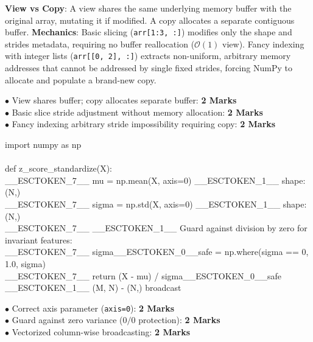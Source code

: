 \begin{solutionbox}
\textbf{View vs Copy}: A view shares the same underlying memory buffer with the original array, mutating it if modified. A copy allocates a separate contiguous buffer.
\textbf{Mechanics}: Basic slicing (\texttt{arr[1:3, :]}) modifies only the shape and strides metadata, requiring no buffer reallocation ($\mathcal{O}(1)$ view). Fancy indexing with integer lists (\texttt{arr[[0, 2], :]}) extracts non-uniform, arbitrary memory addresses that cannot be addressed by single fixed strides, forcing NumPy to allocate and populate a brand-new copy.
\begin{markingrubric}
$\bullet$ View shares buffer; copy allocates separate buffer: \textbf{2 Marks}\\
$\bullet$ Basic slice stride adjustment without memory allocation: \textbf{2 Marks}\\
$\bullet$ Fancy indexing arbitrary stride impossibility requiring copy: \textbf{2 Marks}
\end{markingrubric}
\end{solutionbox}

\begin{solutionbox}
\begin{pycode}
import numpy as np\\
~\\
def z\_score\_standardize(X):\\
\_\_ESCTOKEN\_7\_\_ mu = np.mean(X, axis=0)       \_\_ESCTOKEN\_1\_\_ shape: (N,)\\
\_\_ESCTOKEN\_7\_\_ sigma = np.std(X, axis=0)     \_\_ESCTOKEN\_1\_\_ shape: (N,)\\
\_\_ESCTOKEN\_7\_\_ \_\_ESCTOKEN\_1\_\_ Guard against division by zero for invariant features:\\
\_\_ESCTOKEN\_7\_\_ sigma\_\_ESCTOKEN\_0\_\_safe = np.where(sigma == 0, 1.0, sigma)\\
\_\_ESCTOKEN\_7\_\_ return (X - mu) / sigma\_\_ESCTOKEN\_0\_\_safe  \_\_ESCTOKEN\_1\_\_ (M, N) - (N,) broadcast
\end{pycode}
\begin{markingrubric}
$\bullet$ Correct axis parameter (\texttt{axis=0}): \textbf{2 Marks}\\
$\bullet$ Guard against zero variance ($0/0$ protection): \textbf{2 Marks}\\
$\bullet$ Vectorized column-wise broadcasting: \textbf{2 Marks}
\end{markingrubric}
\end{solutionbox}

